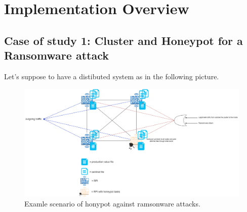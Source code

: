 \chapter{Implementation Overview}



\section{Case of study 1: Cluster and Honeypot for a Ransomware attack}

Let's suppose to have a distibuted system as in the following picture.

\begin{figure}[h!]
  \centering
  \includegraphics[width = 16cm]{images/ramsonwareHoneypot.png}
  \caption{ Examle scenario of honypot against ramsonware attacks.}
  \label{fig:irradiances}
\end{figure}
\FloatBarrier

